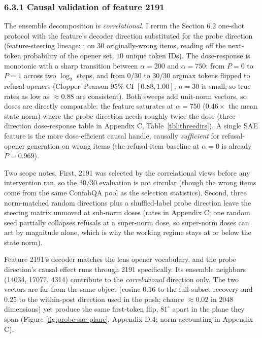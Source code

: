 \subsubsection{6.3.1 Causal validation of feature
2191}\label{causal-validation-of-feature-2191}

The ensemble decomposition is \emph{correlational}. I rerun the Section 6.2 one-shot protocol with the feature's decoder direction substituted for the probe direction (feature-steering lineage: \citealp{templeton2024scaling}; on \(30\) originally-wrong items, reading off the next-token probability of the opener set, \(10\) unique token IDs). The dose-response is monotonic with a sharp transition
between \(\alpha=200\) and \(\alpha=750\): from \(P=0\) to \(P=1\)
across two \(\log_2\) steps, and from \(0/30\) to \(30/30\) argmax
tokens flipped to refusal openers (Clopper--Pearson \(95\%\) CI
\([0.88, 1.00]\); \(n=30\) is small, so true rates as low as
\(\approx 0.88\) are consistent). Both sweeps add unit-norm vectors, so
doses are directly comparable: the feature saturates at \(\alpha=750\)
(\(0.46\times\) the mean state norm) where the probe direction needs roughly twice the dose (three-direction dose-response table in Appendix C, Table~\ref{tbl:threedirs}). A single SAE feature is the more dose-efficient causal handle, causally \emph{sufficient} for
refusal-opener generation on wrong items (the refusal-item baseline at
\(\alpha=0\) is already \(P=0.969\)).

Two scope notes. First, 2191 was selected by the correlational views before any intervention ran, so the \(30/30\) evaluation is not circular (though the wrong items come from the same ConfabQA pool as the selection statistics). Second, three norm-matched random directions plus a shuffled-label probe direction leave the steering matrix unmoved at
sub-norm doses (rates in Appendix C; one random seed partially collapses
refusals at a super-norm dose, so super-norm doses can act by magnitude
alone, which is why the working regime stays at or below the state
norm).

Feature 2191's decoder matches the lens opener vocabulary,
and the probe direction's causal effect runs through 2191 specifically. Its ensemble neighbors (14034, 17077, 4314) contribute to the \emph{correlational} direction only. The two vectors are far from the same object (cosine \(0.16\) to the full-subset recovery and \(0.25\) to the within-post direction used in the push; chance \(\approx 0.02\) in \(2048\) dimensions) yet produce the same first-token flip,
\(81^\circ\) apart in the plane they span (Figure
\ref{fig:probe-sae-plane}, Appendix D.4; norm accounting in Appendix
C).

